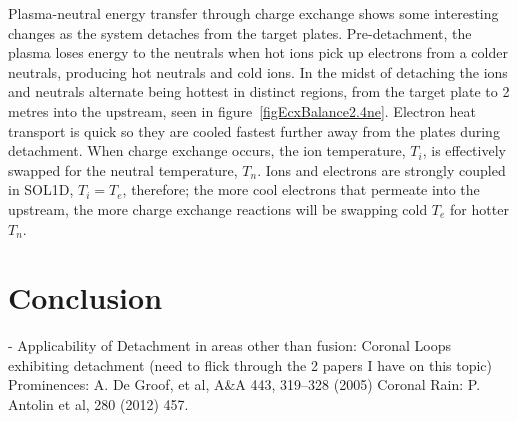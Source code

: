 \documentclass[11pt]{article}  %
\begin{document}
Plasma-neutral energy transfer through charge exchange shows some interesting changes as the system detaches from the target plates. Pre-detachment, the plasma loses energy to the neutrals when hot ions pick up electrons from a colder neutrals, producing hot neutrals and cold ions. In the midst of detaching the ions and neutrals alternate being hottest in distinct regions, from the target plate to 2 metres into the upstream, seen in figure~\ref{figEcxBalance2.4ne}. Electron heat transport is quick so they are cooled fastest further away from the plates during detachment. When charge exchange occurs, the ion temperature, $T_i$, is effectively swapped for the neutral temperature, $T_n$. Ions and electrons are strongly coupled in SOL1D, $T_i = T_e$, therefore; the more cool electrons that permeate into the upstream, the more charge exchange reactions will be swapping cold $T_e$ for hotter $T_n$.





\section{Conclusion}\label{secConclusion}

- Applicability of Detachment in areas other than fusion: Coronal Loops exhibiting detachment (need to flick through the 2 papers I have on this topic) 
Prominences: A. De Groof, et al, A\&A 443, 319–328 (2005)
Coronal Rain: P. Antolin et al, 280 (2012) 457.









\printbibliography
\end{document}
